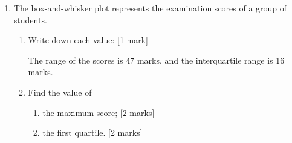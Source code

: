 \documentclass[12pt, twoside]{article}
\begin{document}
\begin{enumerate}
\newpage
\item The box-and-whisker plot represents the examination scores of a group of students.
  \begin{center}
  \end{center}
  \begin{enumerate}
    \item Write down each value: \hfill [1 mark]
    \begin{enumerate}
    \end{enumerate} \vspace{0.5cm}
    The range of the scores is 47 marks, and the interquartile range is 16 marks. \vspace{0.5cm}
    \item Find the value of
    \begin{enumerate}
      \item the maximum score; \hfill [2 marks] \vspace{1cm}
      \item the first quartile. \hfill [2 marks]
    \end{enumerate}
  \end{enumerate}


\end{enumerate}
\end{document}
